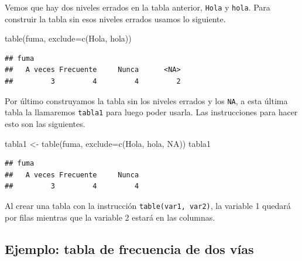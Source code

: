 \documentclass[
]{book}
\makeatletter
\newenvironment{Shaded}{\begin{snugshade}}{\end{snugshade}}
\newcommand{\AttributeTok}[1]{\textcolor[rgb]{0.77,0.63,0.00}{#1}}
\newcommand{\ConstantTok}[1]{\textcolor[rgb]{0.00,0.00,0.00}{#1}}
\newcommand{\FunctionTok}[1]{\textcolor[rgb]{0.00,0.00,0.00}{#1}}
\newcommand{\NormalTok}[1]{#1}
\newcommand{\OtherTok}[1]{\textcolor[rgb]{0.56,0.35,0.01}{#1}}
\newcommand{\StringTok}[1]{\textcolor[rgb]{0.31,0.60,0.02}{#1}}
\newenvironment{kframe}{%
\medskip{}
\setlength{\fboxsep}{.8em}
 \def\at@end@of@kframe{}%
 \ifinner\ifhmode%
  \def\at@end@of@kframe{\end{minipage}}%
  \begin{minipage}{\columnwidth}%
 \fi\fi%
 \def\FrameCommand##1{\hskip\@totalleftmargin \hskip-\fboxsep
 \colorbox{shadecolor}{##1}\hskip-\fboxsep
     \hskip-\linewidth \hskip-\@totalleftmargin \hskip\columnwidth}%
 \MakeFramed {\advance\hsize-\width
   \@totalleftmargin\z@ \linewidth\hsize
   \@setminipage}}%
 {\par\unskip\endMakeFramed%
 \at@end@of@kframe}
\renewenvironment{Shaded}{\begin{kframe}}{\end{kframe}}
\newenvironment{rmdblock}[1]
  {
  \begin{itemize}
  \renewcommand{\labelitemi}{
    \raisebox{-.7\height}[0pt][0pt]{
      {\setkeys{Gin}{width=3em,keepaspectratio}\texttt{[image: images/\#1]}}
    }
  }
  \setlength{\fboxsep}{1em}
  \begin{kframe}
  \item
  }
  {
  \end{kframe}
  \end{itemize}
  }
\newenvironment{rmdnote}
  {\begin{rmdblock}{note}}
  {\end{rmdblock}}
\makeatother
\begin{document}
Vemos que hay dos niveles errados en la tabla anterior, \texttt{Hola} y \texttt{hola}. Para construir la tabla sin esos niveles errados usamos lo siguiente.

\begin{Shaded}
\begin{Highlighting}[]
\FunctionTok{table}\NormalTok{(fuma, }\AttributeTok{exclude=}\FunctionTok{c}\NormalTok{(}\StringTok{\textquotesingle{}Hola\textquotesingle{}}\NormalTok{, }\StringTok{\textquotesingle{}hola\textquotesingle{}}\NormalTok{))}
\end{Highlighting}
\end{Shaded}

\begin{verbatim}
## fuma
##   A veces Frecuente     Nunca      <NA> 
##         3         4         4         2
\end{verbatim}

Por último construyamos la tabla sin los niveles errados y los \texttt{NA}, a esta última tabla la llamaremos \texttt{tabla1} para luego poder usarla. Las instrucciones para hacer esto son las siguientes.

\begin{Shaded}
\begin{Highlighting}[]
\NormalTok{tabla1 }\OtherTok{\textless{}{-}} \FunctionTok{table}\NormalTok{(fuma, }\AttributeTok{exclude=}\FunctionTok{c}\NormalTok{(}\StringTok{\textquotesingle{}Hola\textquotesingle{}}\NormalTok{, }\StringTok{\textquotesingle{}hola\textquotesingle{}}\NormalTok{, }\ConstantTok{NA}\NormalTok{))}
\NormalTok{tabla1}
\end{Highlighting}
\end{Shaded}

\begin{verbatim}
## fuma
##   A veces Frecuente     Nunca 
##         3         4         4
\end{verbatim}

\begin{rmdnote}
Al crear una tabla con la instrucción \texttt{table(var1,\ var2)}, la variable 1 quedará por filas mientras que la variable 2 estará en las columnas.
\end{rmdnote}

\hypertarget{ejemplo-tabla-de-frecuencia-de-dos-vuxedas}{%
\subsection*{Ejemplo: tabla de frecuencia de dos vías}\label{ejemplo-tabla-de-frecuencia-de-dos-vuxedas}}
\end{document}
